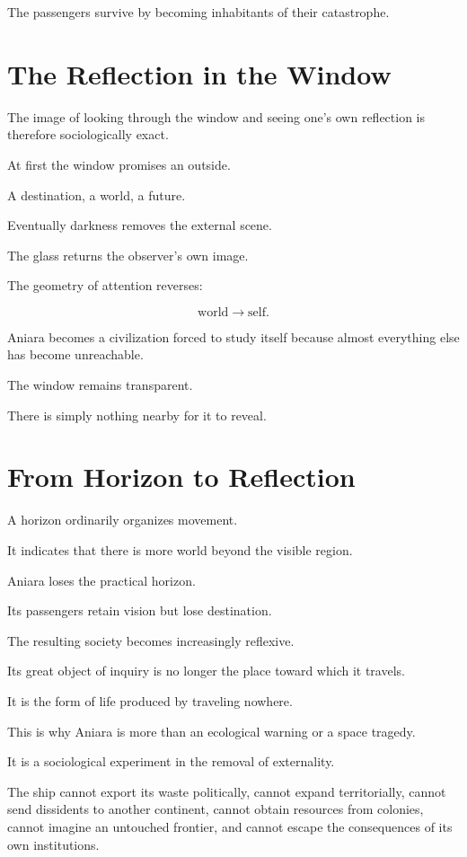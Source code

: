 \documentclass[11pt,oneside]{book}
\theoremstyle{definition}
\theoremstyle{remark}
\begin{document}
The passengers survive by becoming inhabitants of their catastrophe.

\section{The Reflection in the Window}

The image of looking through the window and seeing one's own reflection is therefore sociologically exact.

At first the window promises an outside.

A destination, a world, a future.

Eventually darkness removes the external scene.

The glass returns the observer's own image.

The geometry of attention reverses:

\[
\text{world}
\rightarrow
\text{self}.
\]

Aniara becomes a civilization forced to study itself because almost everything else has become unreachable.

The window remains transparent.

There is simply nothing nearby for it to reveal.

\section{From Horizon to Reflection}

A horizon ordinarily organizes movement.

It indicates that there is more world beyond the visible region.

Aniara loses the practical horizon.

Its passengers retain vision but lose destination.

The resulting society becomes increasingly reflexive.

Its great object of inquiry is no longer the place toward which it travels.

It is the form of life produced by traveling nowhere.

This is why Aniara is more than an ecological warning or a space tragedy.

It is a sociological experiment in the removal of externality.

The ship cannot export its waste politically, cannot expand territorially, cannot send dissidents to another continent, cannot obtain resources from colonies, cannot imagine an untouched frontier, and cannot escape the consequences of its own institutions.
\end{document}
